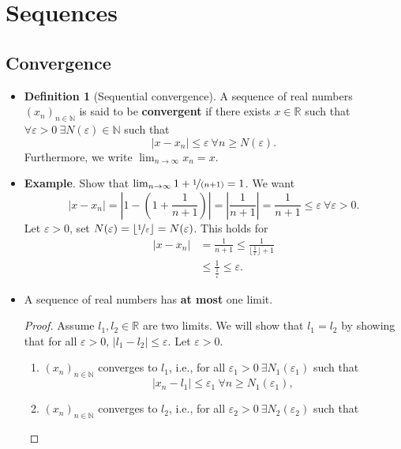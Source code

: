 \documentclass{article}
\newcommand{\R}{\mathbb{R}}
\newcommand{\N}{\mathbb{N}}
\newcommand{\seq}[2]{(#1_{#2})_{#2 \in \N}}
\newcommand{\?}{\stackrel{?}{=}}
\theoremstyle{definition} %
\newtheorem{definition}[subsection]{Definition} %
\begin{document}
\section{Sequences}

\subsection{Convergence}

\begin{itemize}
    \item[]
    \begin{definition}[Sequential convergence]
        A sequence of real numbers $\seq{x}{n}$ is said to be \textbf{convergent} if there exists $x \in \R$ such that $\forall \varepsilon > 0 \ \exists N(\varepsilon) \in \N$ such that
    $$|x - x_n| \leq \varepsilon \ \forall n \geq N(\varepsilon).$$
    Furthermore, we write $\lim_{n \to \infty} x_n = x$.
    \end{definition}
    \item \textbf{Example}. Show that $\lim_{n \to \infty} 1 + \nicefrac{1}{(n + 1)} = 1$. We want
    $$|x - x_n| = \left|1 - \left(1 + \frac{1}{n + 1}\right)\right| = \left|\frac{1}{n + 1}\right| = \frac{1}{n + 1} \leq \varepsilon \ \forall \varepsilon > 0.$$
    Let $\varepsilon > 0$, set $N(\varepsilon) = \lfloor \nicefrac{1}{\varepsilon} \rfloor = N(\varepsilon)$. This holds for
    \begin{align*}
        |x - x_n| &= \frac{1}{n + 1} \leq \frac{1}{\lfloor \frac{1}{\varepsilon} \rfloor + 1} \\
        &\leq \frac{1}{\frac{1}{\varepsilon}} \leq \varepsilon.
    \end{align*}
    \item[]
    \begin{lemma}
        A sequence of real numbers has \textbf{at most} one limit.
    \end{lemma}
    \begin{proof}
        Assume $l_1, l_2 \in \R$ are two limits. We will show that $l_1 = l_2$ by showing that for all $\varepsilon > 0$, $|l_1 - l_2| \leq \varepsilon$. Let $\varepsilon > 0$.
        \begin{enumerate}[label=(\arabic*)]
            \item $\seq{x}{n}$ converges to $l_1$, i.e., for all $\varepsilon_1 > 0 \ \exists N_1(\varepsilon_1)$ such that
            $$|x_n - l_1| \leq \varepsilon_1 \ \forall n \geq N_1(\varepsilon_1),$$
            \item $\seq{x}{n}$ converges to $l_2$, i.e., for all $\varepsilon_2 > 0 \ \exists N_2(\varepsilon_2)$ such that

\end{enumerate}
\end{proof}
\end{itemize}
\end{document}
